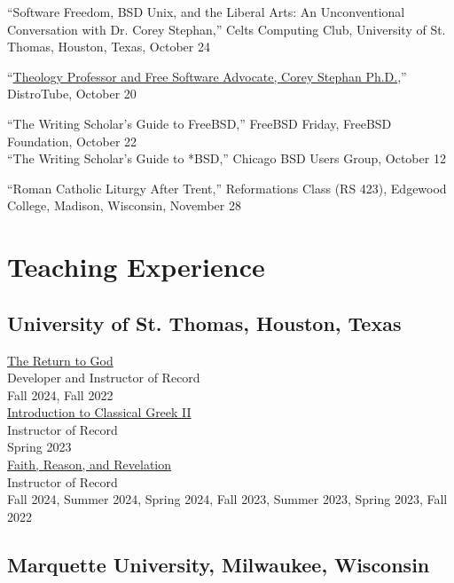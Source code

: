 \documentclass[letterpaper,12pt]{article}
\newcommand{\years}[1]{%
  {\reversemarginpar\strut\marginnote{{\small#1}}}%
}
\begin{document}
{{{{{{{\years{2023}%
%
``Software Freedom, BSD Unix, and the Liberal Arts: An Unconventional Conversation with Dr. Corey Stephan,'' Celts Computing Club, University of St. Thomas, Houston, Texas, October 24 \\ [.3cm]
%
\years{2022}%
%
``\href{https://odysee.com/@DistroTube:2/theology-professor-and-free-software:b}{Theology Professor and Free Software Advocate, Corey Stephan Ph.D.},'' DistroTube, October 20 \\ [.3cm]
%
\years{2021}%
%
``The Writing Scholar’s Guide to FreeBSD,'' FreeBSD Friday, FreeBSD Foundation, October 22 \\ [.3cm]
%
``The Writing Scholar’s Guide to *BSD,'' Chicago BSD Users Group, October 12 \\ [.3cm]
%
\years{2017}%
%
``Roman Catholic Liturgy After Trent,'' Reformations Class (RS 423), Edgewood College, Madison, Wisconsin, November 28

\section*{Teaching Experience}

\subsection*{University of St. Thomas, Houston, Texas}

\href{https://www.coreystephan.com/teaching/return-to-god/}{The Return to God} \\
Developer and Instructor of Record \\
Fall 2024, Fall 2022 \\ [.3cm]
%
\href{https://www.coreystephan.com/teaching/greek/}{Introduction to Classical Greek II} \\
Instructor of Record \\
Spring 2023 \\ [.3cm]
%
\href{https://www.coreystephan.com/teaching/faith-reason-revelation/}{Faith, Reason, and Revelation} \\
Instructor of Record \\
Fall 2024, Summer 2024, Spring 2024, Fall 2023, Summer 2023, Spring 2023, Fall 2022

\subsection*{Marquette University, Milwaukee, Wisconsin}

}}}}}}}
\end{document}
